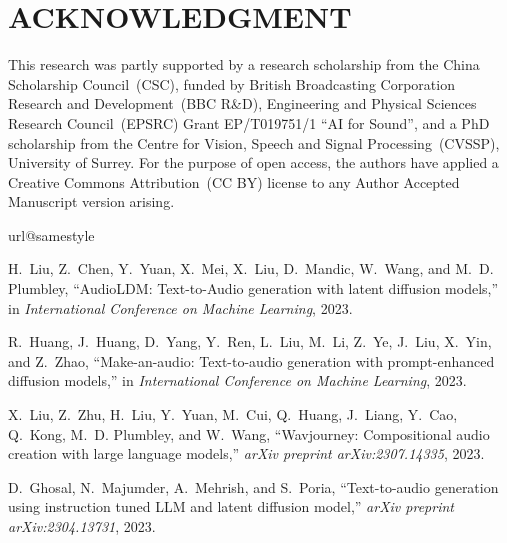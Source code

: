 \documentclass{article}
\begin{document}
\section{ACKNOWLEDGMENT}
\label{sec:ack}
This research was partly supported by a research scholarship from the China Scholarship Council~(CSC), funded by British Broadcasting Corporation Research and Development~(BBC R\&D), Engineering and Physical Sciences Research Council~(EPSRC) Grant EP/T019751/1 ``AI for Sound'', and a PhD scholarship from the Centre for Vision, Speech and Signal Processing~(CVSSP), University of Surrey. 
For the purpose of open access, the authors have applied a Creative Commons Attribution~(CC BY) license to any Author Accepted Manuscript version arising.


\begin{thebibliography}{10}
\providecommand{\url}[1]{#1}
\csname url@samestyle\endcsname
\providecommand{\newblock}{\relax}
\providecommand{\bibinfo}[2]{#2}
\providecommand{\BIBentrySTDinterwordspacing}{\spaceskip=0pt\relax}
\providecommand{\BIBentryALTinterwordstretchfactor}{4}
\providecommand{\BIBentryALTinterwordspacing}{\spaceskip=\fontdimen2\font plus
\BIBentryALTinterwordstretchfactor\fontdimen3\font minus \fontdimen4\font\relax}
\providecommand{\BIBforeignlanguage}[2]{{\expandafter\ifx\csname l@#1\endcsname\relax
\typeout{** WARNING: IEEEtran.bst: No hyphenation pattern has been}\typeout{** loaded for the language `#1'. Using the pattern for}\typeout{** the default language instead.}\else
\language=\csname l@#1\endcsname
\fi
#2}}
\providecommand{\BIBdecl}{\relax}
\BIBdecl

H.~{Liu}, Z.~{Chen}, Y.~{Yuan}, X.~{Mei}, X.~{Liu}, D.~{Mandic}, W.~{Wang}, and M.~D. {Plumbley}, ``{AudioLDM: Text-to-Audio generation with latent diffusion models},'' in \emph{International Conference on Machine Learning}, 2023.

R.~Huang, J.~Huang, D.~Yang, Y.~Ren, L.~Liu, M.~Li, Z.~Ye, J.~Liu, X.~Yin, and Z.~Zhao, ``Make-an-audio: Text-to-audio generation with prompt-enhanced diffusion models,'' in \emph{International Conference on Machine Learning}, 2023.

X.~Liu, Z.~Zhu, H.~Liu, Y.~Yuan, M.~Cui, Q.~Huang, J.~Liang, Y.~Cao, Q.~Kong, M.~D. Plumbley, and W.~Wang, ``Wavjourney: Compositional audio creation with large language models,'' \emph{arXiv preprint arXiv:2307.14335}, 2023.

D.~Ghosal, N.~Majumder, A.~Mehrish, and S.~Poria, ``Text-to-audio generation using instruction tuned {LLM} and latent diffusion model,'' \emph{arXiv preprint arXiv:2304.13731}, 2023.


\end{thebibliography}
\end{document}

